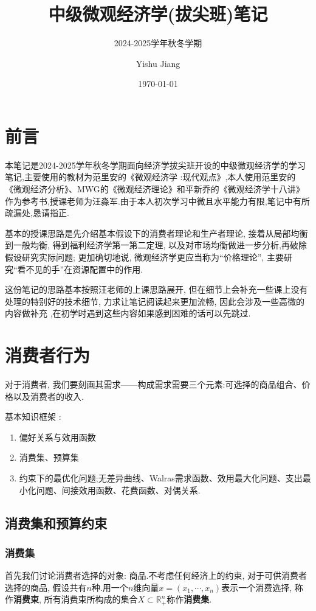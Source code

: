 \documentclass[lang=cn,10pt]{elegantbook}
\title{中级微观经济学(拔尖班)笔记}
\subtitle{2024-2025学年秋冬学期}
\author{Yishu Jiang}
\institute{School of Economics,Zhejiang University}
\date{\today}
\begin{document}
\maketitle
\frontmatter
\chapter*{前言}
{\fangsong 
    本笔记是2024-2025学年秋冬学期面向经济学拔尖班开设的中级微观经济学的学习笔记,主要使用的教材为范里安的《微观经济学 :现代观点》,本人使用范里安的《微观经济分析》、MWG的《微观经济理论》和平新乔的《微观经济学十八讲》作为参考书,授课老师为汪淼军.由于本人初次学习中微且水平能力有限,笔记中有所疏漏处,恳请指正.

    基本的授课思路是先介绍基本假设下的消费者理论和生产者理论, 接着从局部均衡到一般均衡, 得到福利经济学第一第二定理, 以及对市场均衡做进一步分析,再破除假设研究实际问题; 更加确切地说, 微观经济学更应当称为“价格理论”, 主要研究“看不见的手”在资源配置中的作用.

    这份笔记的思路基本按照汪老师的上课思路展开, 但在细节上会补充一些课上没有处理的特别好的技术细节, 力求让笔记阅读起来更加流畅, 因此会涉及一些高微的内容做补充 ,在初学时遇到这些内容如果感到困难的话可以先跳过.
}
\newpage

\tableofcontents

\mainmatter
\chapter{消费者行为}
对于消费者, 我们要刻画其需求——构成需求需要三个元素:可选择的商品组合、价格以及消费者的收入.

基本知识框架 :
\begin{enumerate}
    \item 偏好关系与效用函数
    \item 消费集、预算集
    \item 约束下的最优化问题;无差异曲线、Walras需求函数、效用最大化问题、支出最小化问题、间接效用函数、花费函数、对偶关系.
\end{enumerate}
\newpage
\section{消费集和预算约束}

\subsection{消费集}
首先我们讨论消费者选择的对象: 商品.不考虑任何经济上的约束, 对于可供消费者选择的商品, 假设共有$n$种.用一个$n$维向量$x=(x_1,\cdots,x_n)$表示一个消费选择, 称作\textbf{消费束}, 所有消费束所构成的集合$X\subset \mathbb{R}^n_{+}$称作\textbf{消费集}.
\end{document}
